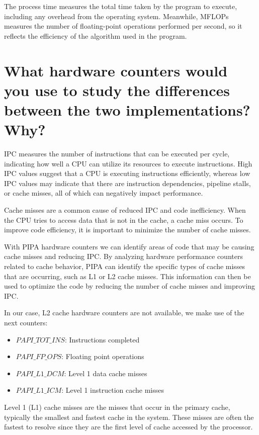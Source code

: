 \documentclass[11pt]{article}
\begin{document}
The process time measures the total time taken by the program to execute, including any overhead from the operating system. Meanwhile, MFLOPs measures the number of floating-point operations performed per second, so it reflects the efficiency of the algorithm used in the program.

\hypertarget{5}{%
\section{What hardware counters would you use to study the differences between the two
implementations? Why?}\label{5}}

IPC measures the number of instructions that can be executed per cycle, indicating how well a CPU can utilize its resources to execute instructions. High IPC values suggest that a CPU is executing instructions efficiently, whereas low IPC values may indicate that there are instruction dependencies, pipeline stalls, or cache misses, all of which can negatively impact performance.

Cache misses are a common cause of reduced IPC and code inefficiency. When the CPU tries to access data that is not in the cache, a cache miss occurs. To improve code efficiency, it is important to minimize the number of cache misses.

With PIPA hardware counters we can identify areas of code that may be causing cache misses and reducing IPC. By analyzing hardware performance counters related to cache behavior, PIPA can identify the specific types of cache misses that are occurring, such as L1 or L2 cache misses. This information can then be used to optimize the code by reducing the number of cache misses and improving IPC.

In our case, L2 cache hardware counters are not available, we make use of the next counters:

\begin{itemize}
    \item $PAPI\_TOT\_INS$: Instructions completed
    \item $PAPI\_FP\_OPS$: Floating point operations
    \item $PAPI\_L1\_DCM$: Level 1 data cache misses
    \item $PAPI\_L1\_ICM$: Level 1 instruction cache misses
\end{itemize}

Level 1 (L1) cache misses are the misses that occur in the primary cache, typically the smallest and fastest cache in the system. These misses are often the fastest to resolve since they are the first level of cache accessed by the processor.
\end{document}
